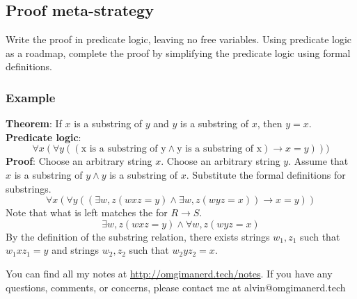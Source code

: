 \documentclass[letterpaper, 12pt]{math}
\begin{document}
\subsection*{Proof meta-strategy}
Write the proof in predicate logic, leaving no free variables. Using predicate
logic as a roadmap, complete the proof by simplifying the predicate logic
using formal definitions.

\subsubsection*{Example}
\textbf{Theorem}: If \( x \) is a substring of \( y \) and \( y \) is a
substring of \( x \), then \( y = x \). \\
\textbf{Predicate logic}:
\[ \forall{x}(\forall{y}((\text{x is a substring of y}\wedge\text{y is a
  substring of x})\to x = y))) \]
\textbf{Proof}: Choose an arbitrary string \( x \). Choose an arbitrary string
\( y \). Assume that \( x \) is a substring of \( y\wedge y \) is a substring of
\( x \). Substitute the formal definitions for substrings.
\[ \forall{x}(\forall{y}((\exists{w,z}(wxz = y)\wedge\exists{w,z}(wyz = x))\to
  x = y)) \]
Note that what is left matches the for \( R\to S \).
\[ \exists{w,z}(wxz = y)\wedge\forall{w,z}(wyz = x) \]
By the definition of the substring relation, there exists strings \( w_1,z_1 \)
such that \( w_1xz_1 = y \) and strings \( w_2,z_2 \) such that
\( w_2yz_2 = x \).

\begin{center}
  You can find all my notes at \url{http://omgimanerd.tech/notes}. If you have
  any questions, comments, or concerns, please contact me at
  alvin@omgimanerd.tech
\end{center}
\end{document}
